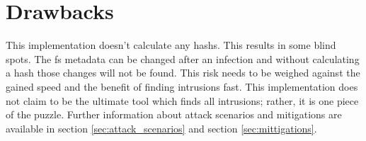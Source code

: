 \section{Drawbacks}

This implementation doesn't calculate any \glspl{hash}. This results in some blind spots. The \gls{fs} \gls{metadata} can be changed after an infection and without calculating a \gls{hash} those changes will not be found. \cite{changing:attributes} This risk needs to be weighed against the gained speed and the benefit of finding intrusions fast. This implementation does not claim to be the ultimate tool which finds all intrusions; rather, it is one piece of the puzzle. Further information about attack scenarios and mitigations are available in section \ref{sec:attack_scenarios} and section \ref{sec:mittigations}.

